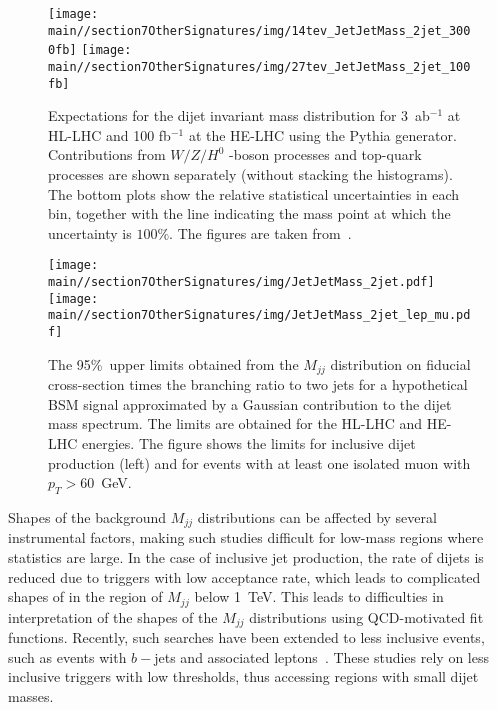 \begin{figure}[h]
\begin{center}
   \texttt{[image: \\main//section7OtherSignatures/img/14tev\_JetJetMass\_2jet\_3000fb]}
   \texttt{[image: \\main//section7OtherSignatures/img/27tev\_JetJetMass\_2jet\_100fb]}
\end{center}
\caption{Expectations for the dijet invariant mass distribution for 3~ab$^{-1}$ at HL-LHC and
100 fb$^{-1}$ at the HE-LHC using the Pythia generator. Contributions
from  $W/Z/H^0$ -boson processes and top-quark processes are shown separately (without stacking the histograms). The bottom plots show the relative  statistical uncertainties in each bin, together with the line indicating the mass point at which the uncertainty is $100\%$. The figures are taken from~\cite{Chekanov:2017pnx}.}
\label{fig:14tev_JetJetMass_2jet}
\end{figure}

\begin{figure}[ht]
\begin{center}
   \texttt{[image: \\main//section7OtherSignatures/img/JetJetMass\_2jet.pdf]}
   \texttt{[image: \\main//section7OtherSignatures/img/JetJetMass\_2jet\_lep\_mu.pdf]}
\end{center}
\caption{The 95\%~\cl upper limits obtained from the
$M_{jj}$  distribution on fiducial cross-section times the  branching ratio to two jets
for a hypothetical BSM signal approximated by a Gaussian contribution to the dijet mass spectrum.  The limits are obtained for the HL-LHC and HE-LHC energies. The figure shows the limits for inclusive dijet production (left) and for events with at least one isolated muon with $p_T>60$~GeV.}
\label{fig:JetJetMass_jet}
\end{figure}


Shapes of the background $M_{jj}$ distributions can be affected by several instrumental factors, making
such studies difficult for low-mass regions where statistics are large.
In the case of inclusive jet production, the rate of dijets is reduced  due to triggers with low acceptance rate, which leads to complicated shapes of in the region of $M_{jj}$ below 1~TeV. 
This leads to difficulties in interpretation of the shapes
of the $M_{jj}$ distributions using QCD-motivated fit functions.
Recently, such searches have been extended to less inclusive events, such as events with $b-$jets and  associated leptons~\cite{Aaboud:2018tqo,Collaboration:2320658}. These studies rely on less inclusive triggers with low thresholds, thus accessing regions with small dijet masses. 

